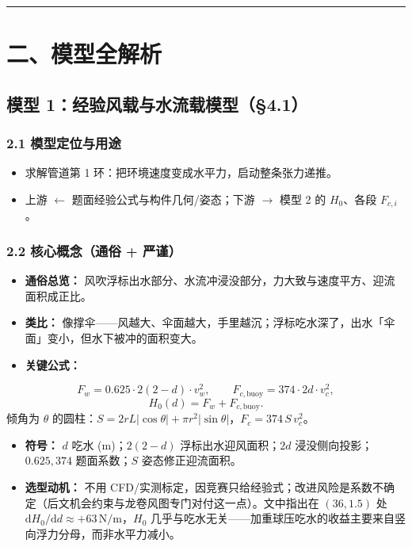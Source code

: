 \documentclass[UTF8,a4paper,zihao=-4]{ctexart}
\begin{document}
\vspace{0.4em}\hrule\vspace{0.4em}

\section{\texorpdfstring{二、模型全解析}{二、模型全解析}}

\subsection{\texorpdfstring{模型 1：经验风载与水流载模型（§4.1）}{模型 1：经验风载与水流载模型（§4.1）}}

\subsubsection{\texorpdfstring{2.1 模型定位与用途}{2.1 模型定位与用途}}
\begin{itemize}[leftmargin=1.5em]
\item 求解管道第 1 环：把环境速度变成水平力，启动整条张力递推。
\item 上游 $\leftarrow$ 题面经验公式与构件几何/姿态；下游 $\rightarrow$ 模型 2 的 \(H_0\)、各段 \(F_{c,i}\)。
\end{itemize}

\subsubsection{\texorpdfstring{2.2 核心概念（通俗 + 严谨）}{2.2 核心概念（通俗 + 严谨）}}
\begin{itemize}[leftmargin=1.5em]
\item \textbf{通俗总览：} 风吹浮标出水部分、水流冲浸没部分，力大致与速度平方、迎流面积成正比。
\item \textbf{类比：} 像撑伞------风越大、伞面越大，手里越沉；浮标吃水深了，出水「伞面」变小，但水下被冲的面积变大。
\item \textbf{关键公式：}
\end{itemize}
  \[
  F_w=0.625\cdot 2(2-d)\cdot v_w^2,\qquad
  F_{c,\mathrm{buoy}}=374\cdot 2d\cdot v_c^2,
  \]
  \[
  H_0(d)=F_w+F_{c,\mathrm{buoy}}.
  \]
  倾角为 \(\theta\) 的圆柱：\(S=2rL|\cos\theta|+\pi r^2|\sin\theta|\)，\(F_c=374\,S\,v_c^2\)。
\begin{itemize}[leftmargin=1.5em]
\item \textbf{符号：} \(d\) 吃水 (m)；\(2(2-d)\) 浮标出水迎风面积；\(2d\) 浸没侧向投影；\(0.625,374\) 题面系数；\(S\) 姿态修正迎流面积。
\item \textbf{选型动机：} 不用 CFD/实测标定，因竞赛只给经验式；改进风险是系数不确定（后文机会约束与龙卷风图专门对付这一点）。文中指出在 \((36,1.5)\) 处 \(\mathrm{d}H_0/\mathrm{d}d\approx +63\,\mathrm{N/m}\)，\(H_0\) 几乎与吃水无关------加重球压吃水的收益主要来自竖向浮力分母，而非水平力减小。
\end{itemize}
\end{document}
